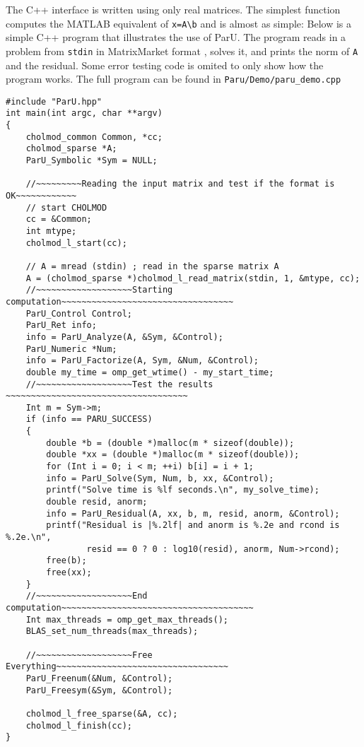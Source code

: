 \documentclass[12pt]{article}
\begin{document}
The C++ interface is written using only real matrices.  
The simplest function computes the MATLAB equivalent of
\verb'x=A\b' and is almost as simple:
Below is a simple C++ program that illustrates the use of ParU.  The
program reads in a problem from \verb'stdin' in MatrixMarket
format \cite{BoisvertPozoRemingtonBarrettDongarra97}, solves it, and prints the
norm of \verb'A' and the residual. 
Some error testing code is omited to only show how the program works. The full 
program can be found in 
\verb'Paru/Demo/paru_demo.cpp'
\begin{verbatim}
#include "ParU.hpp"
int main(int argc, char **argv)
{
    cholmod_common Common, *cc;
    cholmod_sparse *A;
    ParU_Symbolic *Sym = NULL;

    //~~~~~~~~~Reading the input matrix and test if the format is OK~~~~~~~~~~~~
    // start CHOLMOD
    cc = &Common;
    int mtype;
    cholmod_l_start(cc);

    // A = mread (stdin) ; read in the sparse matrix A
    A = (cholmod_sparse *)cholmod_l_read_matrix(stdin, 1, &mtype, cc);
    //~~~~~~~~~~~~~~~~~~~Starting computation~~~~~~~~~~~~~~~~~~~~~~~~~~~~~~~~~~
    ParU_Control Control;
    ParU_Ret info;
    info = ParU_Analyze(A, &Sym, &Control);
    ParU_Numeric *Num;
    info = ParU_Factorize(A, Sym, &Num, &Control);
    double my_time = omp_get_wtime() - my_start_time;
    //~~~~~~~~~~~~~~~~~~~Test the results ~~~~~~~~~~~~~~~~~~~~~~~~~~~~~~~~~~~~
    Int m = Sym->m;
    if (info == PARU_SUCCESS)
    {
        double *b = (double *)malloc(m * sizeof(double));
        double *xx = (double *)malloc(m * sizeof(double));
        for (Int i = 0; i < m; ++i) b[i] = i + 1;
        info = ParU_Solve(Sym, Num, b, xx, &Control);
        printf("Solve time is %lf seconds.\n", my_solve_time);
        double resid, anorm;
        info = ParU_Residual(A, xx, b, m, resid, anorm, &Control);
        printf("Residual is |%.2lf| and anorm is %.2e and rcond is %.2e.\n",
                resid == 0 ? 0 : log10(resid), anorm, Num->rcond);
        free(b);
        free(xx);
    }
    //~~~~~~~~~~~~~~~~~~~End computation~~~~~~~~~~~~~~~~~~~~~~~~~~~~~~~~~~~~~~
    Int max_threads = omp_get_max_threads();
    BLAS_set_num_threads(max_threads);

    //~~~~~~~~~~~~~~~~~~~Free Everything~~~~~~~~~~~~~~~~~~~~~~~~~~~~~~~~~~
    ParU_Freenum(&Num, &Control);
    ParU_Freesym(&Sym, &Control);

    cholmod_l_free_sparse(&A, cc);
    cholmod_l_finish(cc);
}
\end{verbatim}
\end{document}
